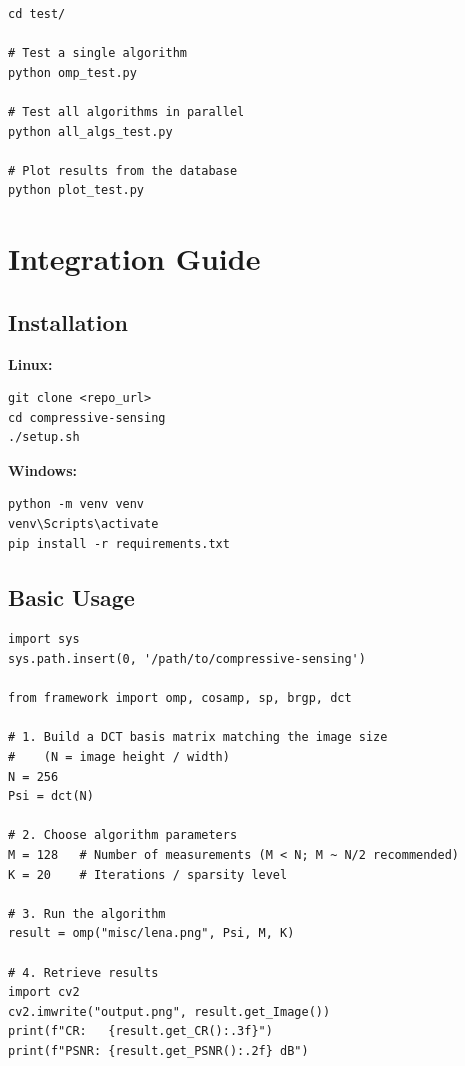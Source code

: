 \documentclass[12pt,a4paper]{article}
\begin{document}
\begin{lstlisting}[style=bash]
cd test/

# Test a single algorithm
python omp_test.py

# Test all algorithms in parallel
python all_algs_test.py

# Plot results from the database
python plot_test.py
\end{lstlisting}

\section{Integration Guide}

\subsection{Installation}

\textbf{Linux:}
\begin{lstlisting}[style=bash]
git clone <repo_url>
cd compressive-sensing
./setup.sh
\end{lstlisting}

\textbf{Windows:}
\begin{lstlisting}
python -m venv venv
venv\Scripts\activate
pip install -r requirements.txt
\end{lstlisting}

\subsection{Basic Usage}

\begin{lstlisting}[style=python]
import sys
sys.path.insert(0, '/path/to/compressive-sensing')

from framework import omp, cosamp, sp, brgp, dct

# 1. Build a DCT basis matrix matching the image size
#    (N = image height / width)
N = 256
Psi = dct(N)

# 2. Choose algorithm parameters
M = 128   # Number of measurements (M < N; M ~ N/2 recommended)
K = 20    # Iterations / sparsity level

# 3. Run the algorithm
result = omp("misc/lena.png", Psi, M, K)

# 4. Retrieve results
import cv2
cv2.imwrite("output.png", result.get_Image())
print(f"CR:   {result.get_CR():.3f}")
print(f"PSNR: {result.get_PSNR():.2f} dB")
\end{lstlisting}
\end{document}
